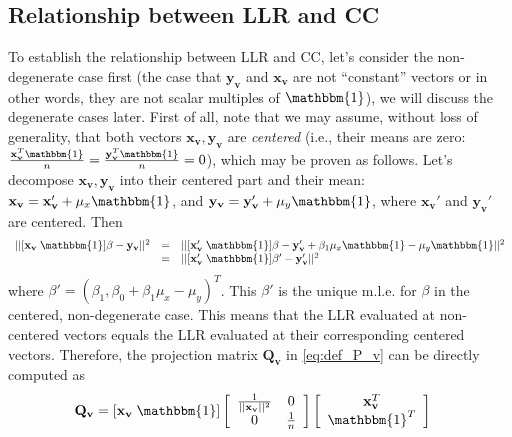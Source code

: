 \subsection{Relationship between LLR and CC}
To establish the relationship between LLR and CC, let's consider the non-degenerate case first (the case that $\mathbf{y}_{\mathbf{v}}$ and $\mathbf{x}_{\mathbf{v}}$ are not ``constant'' vectors or in other words, they are not scalar multiples of $\mathbbm{1}$), we will discuss the degenerate cases later. First of all, note that we may assume, without loss of generality, that both vectors $\mathbf{x}_{\mathbf{v}}, \mathbf{y}_{\mathbf{v}}$ are \emph{centered} (i.e., their means are zero: $\frac{\mathbf{x}_{\mathbf{v}}^{T}\mathbbm{1}}{n} = \frac{\mathbf{y}_{\mathbf{v}}^{T}\mathbbm{1}}{n} = 0$), which may be proven as follows. Let's decompose $\mathbf{x}_{\mathbf{v}}, \mathbf{y}_{\mathbf{v}}$ into their centered part and their mean: $\mathbf{x}_{\mathbf{v}} = \mathbf{x}_{\mathbf{v}}' + \mu_{x}\mathbbm{1}$, and $\mathbf{y}_{\mathbf{v}} = \mathbf{y}_{\mathbf{v}}' + \mu_{y}\mathbbm{1}$, where $\mathbf{x}_{\mathbf{v}}'$ and $\mathbf{y}_{\mathbf{v}}'$ are centered. Then
\begin{displaymath}
    \begin{array}{lcl}
        ||[\mathbf{x}_{\mathbf{v}} \; \mathbbm{1}]\beta - \mathbf{y}_{\mathbf{v}}||^{2} &=& ||[\mathbf{x}_{\mathbf{v}}' \; \mathbbm{1}]\beta - \mathbf{y}_{\mathbf{v}}' + \beta_{1}\mu_{x}\mathbbm{1} - \mu_{y}\mathbbm{1}||^{2}\\
        &=&||[\mathbf{x}_{\mathbf{v}}' \; \mathbbm{1}]\beta' - \mathbf{y}_{\mathbf{v}}'||^{2}
    \end{array}
\end{displaymath}
where $\beta' = (\beta_{1}, \beta_{0} + \beta_{1}\mu_{x} - \mu_{y})^{T}$. This $\beta'$ is the unique m.l.e. for $\beta$ in the centered, non-degenerate case. This means that the LLR evaluated at non-centered vectors equals the LLR evaluated at their corresponding centered vectors. Therefore, the projection matrix $\mathbf{Q}_{\mathbf{v}}$ in \eqref{eq:def_P_v} can be directly computed as
\begin{align*}
    \mathbf{Q}_{\mathbf{v}} &= [\mathbf{x}_{\mathbf{v}} \; \mathbbm{1}]
    \left[\begin{array}{cc}
        \frac{1}{||\mathbf{x}_{\mathbf{v}}||^{2}} & 0\\
        0 & \frac{1}{n}
    \end{array}\right]
    \left[\begin{array}{c}
        \mathbf{x}_{\mathbf{v}}^{T}\\
        \mathbbm{1}^{T}
    \end{array}\right]
\end{align*}
